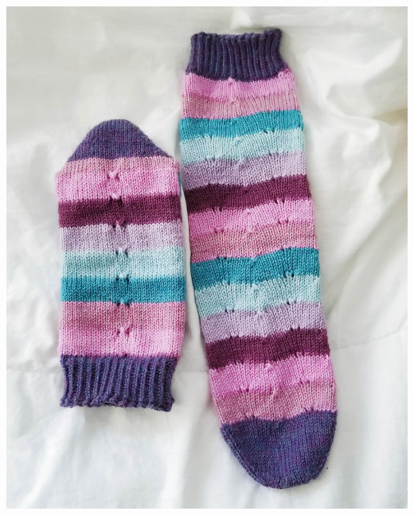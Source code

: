 \documentclass[12pt]{article}
\begin{document}
\begin{multicols}{2}
\vfill
\columnbreak

\begin{flushright}
\includegraphics[width=0.9\linewidth]{laidflat-small.jpg}

\end{flushright}

\end{multicols}
\end{document}
